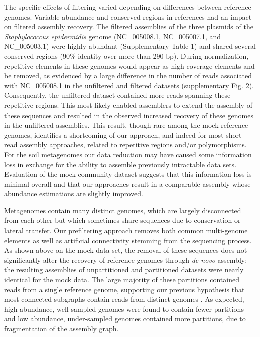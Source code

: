 \documentclass{nature}%
\begin{document}
The specific effects of filtering varied depending on differences
between reference genomes.  Variable abundance and conserved regions
in references had an impact on filtered assembly recovery.  The
filtered assemblies of the three plasmids of the \emph{Staphylococcus
  epidermidis} genome (NC\_005008.1, NC\_005007.1, and NC\_005003.1)
were highly abundant (Supplementary Table 1) and shared several conserved
regions (90\% identity over more than 290 bp).  During normalization,
repetitive elements in these genomes would appear as high coverage
elements and be removed, as evidenced by a large difference in the
number of reads associated with NC\_005008.1 in the unfiltered and
filtered datasets (supplementary Fig. 2). Consequently, the unfiltered dataset
contained more reads spanning these repetitive regions.  This most
likely enabled assemblers to extend the assembly of these sequences
and resulted in the observed increased recovery of these genomes in
the unfiltered assemblies. This result, though rare among the mock
reference genomes, identifies a shortcoming of our approach, and
indeed for most short-read assembly approaches, related to repetitive
regions and/or polymorphisms.  For the soil metagenomes our data
reduction may have caused some information loss in exchange for the
ability to assemble previously intractable data sets.  Evaluation of
the mock community dataset suggests that this information loss is
minimal overall and that our approaches result in a comparable
assembly whose abundance estimations are slightly improved.


Metagenomes contain many distinct genomes, which are largely
disconnected from each other but which sometimes share sequences due
to conservation or lateral transfer.  Our prefiltering approach
removes both common multi-genome elements as well as artificial
connectivity stemming from the sequencing process.
As shown above on the mock data set, the removal of these sequences
does not significantly alter the recovery of reference genomes through
{\em de novo} assembly: the resulting assemblies of unpartitioned and
partitioned datasets were nearly identical for the mock data.  The
large majority of these partitions contained reads from a single
reference genome, supporting our previous hypothesis that most
connected subgraphs contain reads from distinct genomes
\cite{Pell:2012cq}.  As expected, high abundance, well-sampled genomes
were found to contain fewer partitions and low abundance, under-sampled
genomes contained more partitions, due to fragmentation of the
assembly graph.
\end{document}

